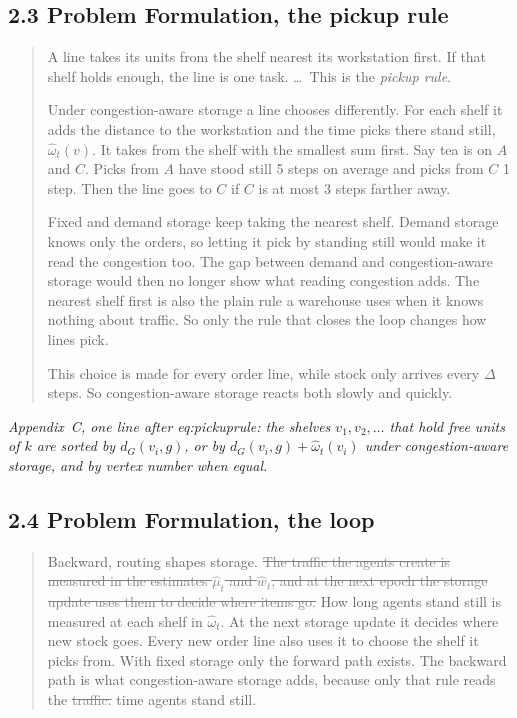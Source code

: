 \documentclass[11pt,a4paper]{article}
\newcommand{\new}[1]{\textcolor{newc}{#1}}
\newcommand{\old}[1]{\textcolor{gray}{\sout{#1}}}
\newcommand{\mockup}[1]{\textit{#1}}
\begin{document}
\subsection*{2.3 Problem Formulation, the pickup rule}
\begin{quote}
A line takes its units from the shelf nearest its workstation first. If that shelf
holds enough, the line is one task. \ldots\ This is the \emph{pickup rule}.

\new{Under congestion-aware storage a line chooses differently. For each shelf it
adds the distance to the workstation and the time picks there stand still,
$\hat\omega_t(v)$. It takes from the shelf with the smallest sum first. Say tea is
on $A$ and $C$. Picks from $A$ have stood still 5 steps on average and picks from
$C$ 1 step. Then the line goes to $C$ if $C$ is at most 3 steps farther away.}

\new{Fixed and demand storage keep taking the nearest shelf. Demand storage knows
only the orders, so letting it pick by standing still would make it read the
congestion too. The gap between demand and congestion-aware storage would then no
longer show what reading congestion adds. The nearest shelf first is also the plain
rule a warehouse uses when it knows nothing about traffic. So only the rule that
closes the loop changes how lines pick.}

\new{This choice is made for every order line, while stock only arrives every
$\Delta$ steps. So congestion-aware storage reacts both slowly and quickly.}
\end{quote}

\mockup{Appendix~C, one line after eq:pickuprule: the shelves $v_1, v_2, \dots$
that hold free units of $k$ are sorted by $d_G(v_i, g)$, or by
$d_G(v_i, g) + \hat\omega_t(v_i)$ under congestion-aware storage, and by vertex
number when equal.}

\subsection*{2.4 Problem Formulation, the loop}
\begin{quote}
Backward, routing shapes storage. \old{The traffic the agents create is measured
in the estimates $\hat\mu_t$ and $\hat w_t$, and at the next epoch the storage
update uses them to decide where items go.}
\new{How long agents stand still is measured at each shelf in $\hat\omega_t$. At the
next storage update it decides where new stock goes. Every new order line also
uses it to choose the shelf it picks from.}
With fixed storage only the forward path exists. The backward path is
what congestion-aware storage adds, because only that rule reads the
\old{traffic.} \new{time agents stand still.}
\end{quote}
\end{document}
